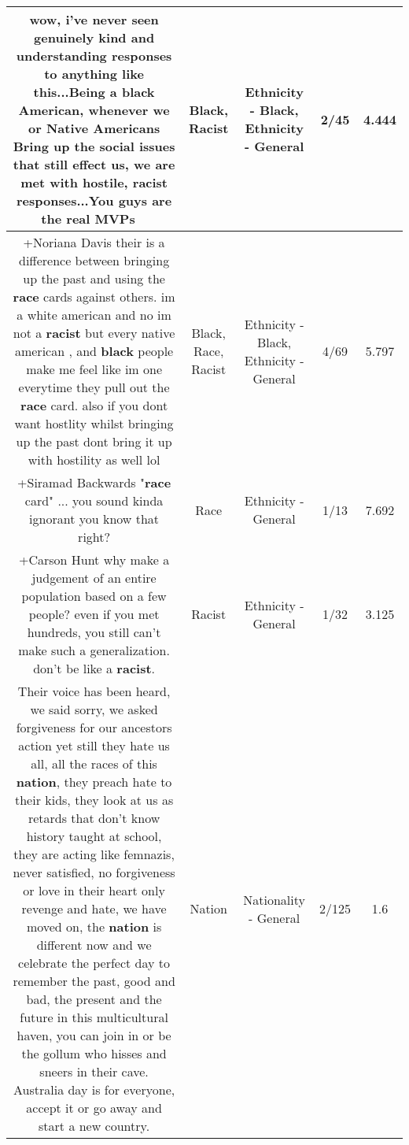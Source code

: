\documentclass[11pt]{article}
\newlength\mylength
\begin{document}
\begin{center}
\begin{longtable}{|C{.65\mylength}|C{.30\mylength}|C{.12\mylength}|C{.12\mylength}|C{.12\mylength}|}
  \small wow, i've never seen genuinely kind and understanding responses to anything like this...Being a \textbf{black} American, whenever we or Native Americans Bring up  the social issues that still effect us, we are met with hostile, \textbf{racist} responses...You guys are the real MVPs 🙌🏿\normalsize   & Black, Racist & Ethnicity - Black, Ethnicity - General & 2/45 & 4.444 \\  \hline
  \small +Noriana Davis their is a difference between bringing up the past and using the \textbf{race} cards against others. im a white american and no im not a \textbf{racist} but every native american , and \textbf{black} people make me feel like im one everytime they pull out the \textbf{race} card. also if you dont want hostlity whilst bringing up the past dont bring it up with hostility as well lol\normalsize   & Black, Race, Racist & Ethnicity - Black, Ethnicity - General & 4/69 & 5.797 \\  \hline
  \small +Siramad Backwards "\textbf{race} card" ... you sound kinda ignorant you know that right?\normalsize   & Race & Ethnicity - General & 1/13 & 7.692 \\  \hline
  \small +Carson Hunt why make a judgement of an entire population based on a few people? even if you met hundreds, you still can't make such a generalization. don't be like a \textbf{racist}.\normalsize   & Racist & Ethnicity - General & 1/32 & 3.125 \\  \hline
  \small Their voice has been heard, we said sorry, we asked forgiveness for our ancestors action yet still they hate us all, all the races of this \textbf{nation}, they preach hate to their kids, they look at us as retards that don't know history taught at school, they are acting like femnazis, never satisfied, no forgiveness or love in their heart only revenge and hate, we have moved on, the \textbf{nation} is different now and we celebrate the perfect day to remember the past, good and bad, the present and the future in this multicultural haven, you can join in or be the gollum who hisses and sneers in their cave. Australia day is for everyone, accept it or go away and start a new country.\normalsize   & Nation & Nationality - General & 2/125 & 1.6 \\  \hline

\end{longtable}
\end{center}
\end{document}
